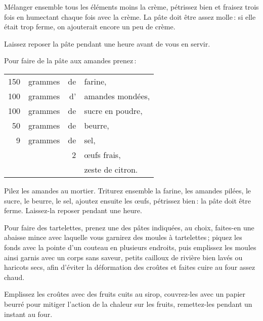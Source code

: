 Mélanger ensemble tous les éléments moins la crème, pétrissez bien et fraisez
trois fois en humectant chaque fois avec la crème. La pâte doit être assez molle :
si elle était trop ferme, on ajouterait encore un peu de crème.

Laissez reposer la pâte pendant une heure avant de vous en servir.

\sk

Pour faire de la pâte aux amandes prenez :

\footnotesize
\begin{longtable}{rrrp{16em}}
    150 & grammes & de & farine,                                                                          \\
    100 & grammes & d' & amandes mondées,                                                                 \\
    100 & grammes & de & sucre en poudre,                                                                 \\
     50 & grammes & de & beurre,                                                                          \\
      9 & grammes & de & sel,                                                                             \\
        &         &  2 & œufs frais,                                                                      \\
        &         &    & zeste de citron.                                                                 \\
\end{longtable}
\normalsize

Pilez les amandes au mortier. Triturez ensemble la farine, les amandes pilées,
le sucre, le beurre, le sel, ajoutez ensuite les œufs, pétrissez bien : la pâte
doit être ferme. Laissez-la reposer pendant une heure.

\sk

Pour faire des tartelettes, prenez une des pâtes indiquées, au choix, faites-en
une abaisse mince avec laquelle vous garnirez des moules à tartelettes ; piquez
les fonds avec la pointe d'un couteau en plusieurs endroits, puis emplissez les
moules ainsi garnis avec un corps sans saveur, petits cailloux de rivière bien
lavés ou haricots secs, afin d'éviter la déformation des croûtes et faites
cuire au four assez chaud.

Emplissez les croûtes avec des fruits cuits au sirop, couvrez-les avec un
papier beurré pour mitiger l'action de la chaleur sur les fruits, remettez-les
pendant un instant au four.

